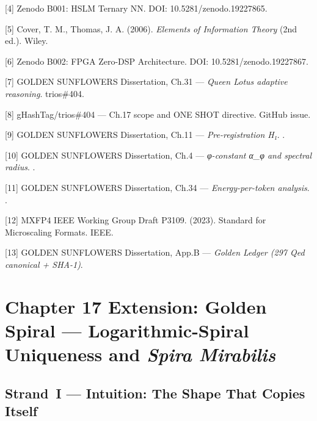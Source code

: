 [4] Zenodo B001: HSLM Ternary NN. DOI:
10.5281/zenodo.19227865.

[5] Cover, T. M., Thomas, J. A. (2006).
\emph{Elements of Information Theory} (2nd ed.).
Wiley.

[6] Zenodo B002: FPGA Zero-DSP Architecture.
DOI: 10.5281/zenodo.19227867.

[7] GOLDEN SUNFLOWERS Dissertation, Ch.31 ---
\emph{Queen Lotus adaptive reasoning}. trios\#404.

[8] gHashTag/trios\#404 --- Ch.17 scope and
ONE SHOT directive. GitHub issue.

[9] GOLDEN SUNFLOWERS Dissertation, Ch.11 ---
\emph{Pre-registration H₁}.
.

[10] GOLDEN SUNFLOWERS Dissertation, Ch.4 ---
\emph{φ-constant α\_φ and spectral radius}.
.

[11] GOLDEN SUNFLOWERS Dissertation, Ch.34 ---
\emph{Energy-per-token analysis}.
.

[12] MXFP4 IEEE Working Group Draft P3109.
(2023). Standard for Microscaling Formats. IEEE.

[13] GOLDEN SUNFLOWERS Dissertation, App.B ---
\emph{Golden Ledger (297 Qed canonical + SHA-1)}.



\clearpage
\chapter*{Chapter 17 Extension: Golden Spiral —
  Logarithmic-Spiral Uniqueness and \textit{Spira Mirabilis}}
\label{ch:17-ext}

\section{Strand~I — Intuition: The Shape That Copies Itself}
\label{sec:17-strand1}

